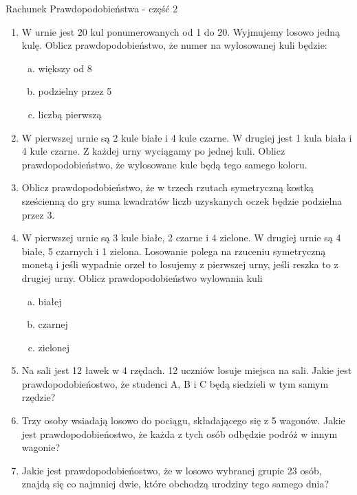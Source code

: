 \documentclass[12pt,a4paper]{article}
\begin{document}
	\begin{center}
		\LARGE Rachunek Prawdopodobieństwa - część 2
	\end{center}
	\vspace{1cm}
	\begin{enumerate}[1.]
		\item W urnie jest 20 kul ponumerowanych od 1 do 20. Wyjmujemy losowo jedną kulę. Oblicz prawdopodobieństwo, że numer na wylosowanej kuli będzie:
		\begin{enumerate}[a)]
			\item większy od 8
			\item podzielny przez 5
			\item liczbą pierwszą
		\end{enumerate}
	\item W pierwszej urnie są 2 kule białe i 4 kule czarne. W drugiej jest 1 kula biała i 4 kule czarne. Z każdej urny wyciągamy po jednej kuli. Oblicz prawdopodobieństwo, że wylosowane kule będą tego samego koloru.
	\item Oblicz prawdopodobieństwo, że w trzech rzutach symetryczną kostką sześcienną do gry suma kwadratów liczb uzyskanych oczek będzie podzielna przez 3.
	\item W pierwszej urnie są 3 kule białe, 2 czarne i 4 zielone. W drugiej urnie są 4 białe, 5 czarnych i 1 zielona. Losowanie polega na rzuceniu symetryczną monetą i jeśli wypadnie orzeł to losujemy z pierwszej urny, jeśli reszka to z drugiej urny. Oblicz prawdopodobieństwo wylowania kuli
	\begin{enumerate}[a)]
		\item białej
		\item czarnej
		\item zielonej
	\end{enumerate}

	\item Na sali jest 12 ławek w 4 rzędach. 12 uczniów losuje miejsca na sali. Jakie jest prawdopodobieńostwo, że studenci A, B i C będą siedzieli w tym samym rzędzie?
	
	\item Trzy osoby wsiadają losowo do pociągu, składającego się z 5 wagonów. Jakie jest prawdopodobieńostwo, że każda z tych osób odbędzie podróż w innym wagonie?
	
	\item Jakie jest prawdopodobieńostwo, że w losowo wybranej grupie 23 osób, znajdą się co najmniej dwie, które obchodzą urodziny tego samego dnia?
	

\end{enumerate}
\end{document}
